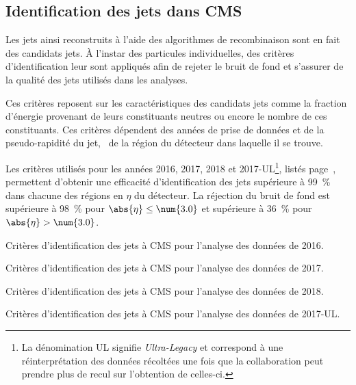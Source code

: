 \subsection{Identification des jets dans CMS}\label{chapter-JERC-section-jets_reco-subsec-jetID}
Les jets ainsi reconstruits à l'aide des algorithmes de recombinaison sont en fait des \og candidats \fg{} jets.
À l'instar des particules individuelles, des critères d'identification leur sont appliqués afin de rejeter le bruit de fond et s'assurer de la qualité des jets utilisés dans les analyses.
\par Ces critères reposent sur les caractéristiques des candidats jets comme la fraction d'énergie provenant de leurs constituants neutres ou encore le nombre de ces constituants.
Ces critères dépendent des années de prise de données et de la pseudo-rapidité du jet, \ie\ de la région du détecteur dans laquelle il se trouve.
\par Les critères utilisés pour les années 2016, 2017, 2018 et 2017-UL\footnote{La dénomination \og UL \fg{} signifie \emph{Ultra-Legacy} et correspond à une réinterprétation des données récoltées une fois que la collaboration peut prendre plus de recul sur l'obtention de celles-ci.}, listés page~\pageref{tab-chapter-JERC-section-jets_reco-subsec-jetID-2017UL}, permettent d'obtenir une efficacité d'identification des jets supérieure à \SI{99}{\%} dans chacune des régions en $\eta$ du détecteur.
La réjection du bruit de fond est supérieure à \SI{98}{\%} pour $\abs{\eta}\leq\num{3.0}$ et supérieure à \SI{36}{\%} pour $\abs{\eta}>\num{3.0}$.
\begin{table}[p]
\centering

\caption{Critères d'identification des jets à CMS pour l'analyse des données de 2016.}
\label{tab-chapter-JERC-section-jets_reco-subsec-jetID-2016}
\end{table}
\begin{table}[p]
\centering

\caption{Critères d'identification des jets à CMS pour l'analyse des données de 2017.}
\label{tab-chapter-JERC-section-jets_reco-subsec-jetID-2017}
\end{table}
\begin{table}[p]
\centering

\caption{Critères d'identification des jets à CMS pour l'analyse des données de 2018.}
\label{tab-chapter-JERC-section-jets_reco-subsec-jetID-2018}
\end{table}
\begin{table}[p]
\centering

\caption{Critères d'identification des jets à CMS pour l'analyse des données de 2017-UL.}
\label{tab-chapter-JERC-section-jets_reco-subsec-jetID-2017UL}
\end{table}
